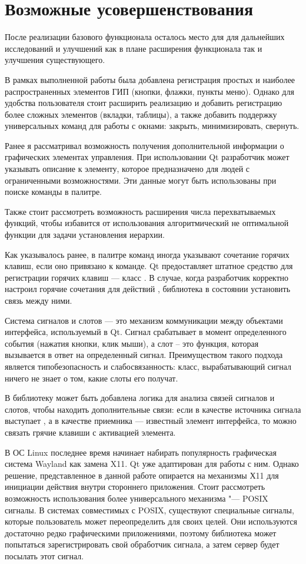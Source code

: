 \section{Возможные усовершенствования}

После реализации базового функционала осталось место для для дальнейших
исследований и улучшений как в плане расширения функционала так и улучшения
существующего.

В рамках выполненной работы была добавлена регистрация простых и наиболее
распространенных элементов ГИП (кнопки, флажки, пункты меню). Однако для
удобства пользователя стоит расширить реализацию и добавить регистрацию более
сложных элементов (вкладки, таблицы), а также добавить поддержку универсальных
команд для работы с окнами: закрыть, минимизировать, свернуть.

Ранее я рассматривал \cite{polshakovvoice} возможность получения дополнительной
информации о графических элементах управления. При использовании Qt разработчик
может указывать описание к элементу, которое предназначено для людей с
ограниченными возможностями. Эти данные могут быть использованы при поиске
команды в палитре.

Также стоит рассмотреть возможность расширения числа перехватываемых функций,
чтобы избавится от использования алгоритмический не оптимальной функции для
задачи установления иерархии.

Как указывалось ранее, в палитре команд иногда указывают сочетание горячих
клавиш, если оно привязано к команде. Qt предоставляет штатное средство для
регистрации горячих клавиш — класс . В случае, когда разработчик
корректно настроил горячие сочетания для действий , библиотека в
состоянии установить связь между ними.

Система сигналов и слотов — это механизм коммуникации между объектами
интерфейса, используемый в Qt. Сигнал срабатывает в момент определенного
события (нажатия кнопки, клик мыши), а слот – это функция, которая вызывается
в ответ на определенный сигнал. Преимуществом такого подхода является
типобезопасность и слабосвязанность: класс, вырабатывающий сигнал ничего не
знает о том, какие слоты его получат.

В библиотеку может быть добавлена логика для анализа связей сигналов и слотов,
чтобы находить дополнительные связи: если в качестве источника сигнала выступает
, а в качестве приемника — известный элемент интерфейса, то
можно связать грячие клавиши с активацией элемента.

В ОС Linux последнее время начинает набирать популярность графическая система
Wayland как замена X11\cite{wayland}. Qt уже адаптирован для работы с ним.
Однако решение, представленное в данной работе опирается на механизмы Х11 для
инициации действия внутри стороннего приложения. Стоит рассмотреть возможность
использования более универсального механизма "--- POSIX сигналы. В системах
совместимых с POSIX, существуют специальные сигналы, которые пользователь может
переопределить для своих целей. Они используются достаточно редко графическими
приложениями, поэтому библиотека может попытаться зарегистрировать свой
обработчик сигнала, а затем сервер будет посылать этот сигнал.
